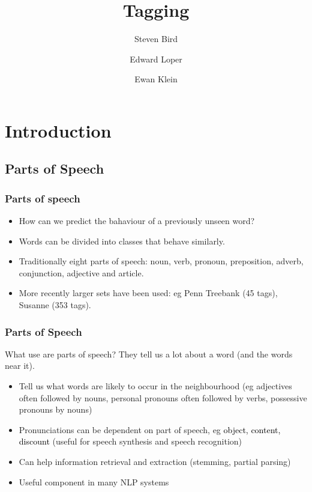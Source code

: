 \documentclass{beamer}             %
\title{Tagging}
\author{Steven Bird \and Edward Loper \and Ewan Klein}
\institute{
  University of Melbourne, AUSTRALIA
  \and
  University of Pennsylvania, USA
  \and
  University of Edinburgh, UK
}
\begin{document}
\frame{\titlepage}

\section{Introduction}

\subsection{Parts of Speech}

\begin{frame}
  \frametitle{Parts of speech}

  \begin{itemize}
  \item How can we predict the bahaviour of a previously unseen word?
  \item Words can be divided into classes that behave similarly.
  \item Traditionally eight parts of speech: noun, verb,
    pronoun, preposition, adverb, conjunction, adjective and article.
  \item More recently larger sets have been used: eg Penn Treebank (45
    tags), Susanne (353 tags).
  \end{itemize}
\end{frame}

\begin{frame}
  \frametitle{Parts of Speech}

  \begin{alertblock}{What use are parts of speech?}
    They tell us a lot about a word (and the words near it).
  \end{alertblock}

  \pause
  \begin{itemize}
  \item Tell us what words are likely to occur in the neighbourhood
    (eg adjectives often followed by nouns, personal pronouns often
    followed by verbs, possessive pronouns by nouns)
  \item Pronunciations can be dependent on part of speech, eg
    \textcolor{black}{object, content, discount} (useful for speech
    synthesis and speech recognition)
  \item Can help information retrieval and extraction (stemming,
    partial parsing) 
  \item Useful component in many NLP systems
  \end{itemize}
  
\end{frame}
\end{document}
